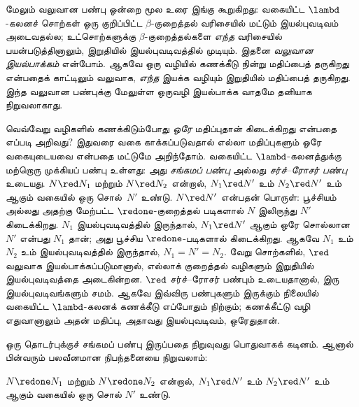 \documentclass[../../../include/open-logic-section]{subfiles}
\begin{document}
மேலும் வலுவான பண்பு ஒன்றை மூல உரை இங்கு கூறுகிறது:
வகையிட்ட $\lambd$-கலனச் சொற்கள் ஒரு குறிப்பிட்ட
$\beta$-குறைத்தல் வரிசையில் மட்டும் இயல்புவடிவம்
அடைவதல்ல; உட்சொற்களுக்கு $\beta$-குறைத்தல்களை
\emph{எந்த} வரிசையில் பயன்படுத்தினாலும், இறுதியில்
இயல்புவடிவத்தில் முடியும். இதனை \emph{வலுவான
இயல்பாக்கம்} என்போம். ஆகவே ஒரு வழியில் கணக்கீடு
நின்று மதிப்பைத் தருகிறது என்பதைக் காட்டிலும் வலுவாக,
\emph{எந்த} இயக்க வழியும் இறுதியில் மதிப்பைத் தருகிறது.
இந்த வலுவான பண்புக்கு மேலுள்ள ஒருவழி இயல்பாக்க
வாதமே தனியாக நிறுவலாகாது.

வெவ்வேறு வழிகளில் கணக்கிடும்போது \emph{ஒரே}
மதிப்புதான் கிடைக்கிறது என்பதை எப்படி அறிவது?
இதுவரை வகை காக்கப்படுவதால் எல்லா மதிப்புகளும்
ஒரே வகையுடையவை என்பதை மட்டுமே அறிந்தோம்.
வகையிட்ட $\lambd$-கலனத்துக்கு மற்றொரு முக்கியப்
பண்பு உள்ளது: அது \emph{சங்கமப் பண்பு} அல்லது
\emph{சர்ச்--ரோசர் பண்பு} உடையது. $N \red N_1$
மற்றும் $N \red N_2$ என்றால், $N_1 \red N'$ உம்
$N_2 \red N'$ உம் ஆகும் வகையில் ஒரு சொல்~$N'$
உண்டு. $N \red N'$ என்பதன் பொருள்: பூச்சியம் அல்லது
அதற்கு மேற்பட்ட $\redone$-குறைத்தல் படிகளால் $N$
இலிருந்து $N'$ கிடைக்கிறது. $N_1$ இயல்புவடிவத்தில்
இருந்தால், $N_1 \red N'$ ஆகும் ஒரே சொல்லான $N'$
என்பது $N_1$ தான்;
அது பூச்சிய $\redone$-படிகளால் கிடைக்கிறது.
ஆகவே $N_1$ உம் $N_2$ உம் இயல்புவடிவத்தில் இருந்தால்,
$N_1 = N' = N_2$. வேறு சொற்களில், $\red$
வலுவாக இயல்பாக்கப்படுமானால், எல்லாக் குறைத்தல்
வழிகளும் இறுதியில் இயல்புவடிவத்தை அடைகின்றன.
$\red$ சர்ச்--ரோசர் பண்பும் உடையதானால்,
இரு இயல்புவடிவங்களும் சமம். ஆகவே இவ்விரு பண்புகளும்
இருக்கும் நிலையில் வகையிட்ட $\lambd$-கலனக்
கணக்கீடு எப்போதும் நிற்கும்; கணக்கீட்டு வழி எதுவானாலும்
அதன் மதிப்பு, அதாவது இயல்புவடிவம், ஒரேதுதான்.

ஒரு தொடர்புக்குச் சங்கமப் பண்பு இருப்பதை நிறுவுவது
பொதுவாகக் கடினம். ஆனால் பின்வரும் பலவீனமான
நிபந்தனையை நிறுவலாம்:

\begin{prop}[பலவீனச் சர்ச்--ரோசர் பண்பு]
$N \redone N_1$ மற்றும் $N \redone N_2$ என்றால்,
$N_1 \red N'$ உம் $N_2 \red N'$ உம் ஆகும் வகையில்
ஒரு சொல் $N'$ உண்டு.
\end{prop}
\end{document}

